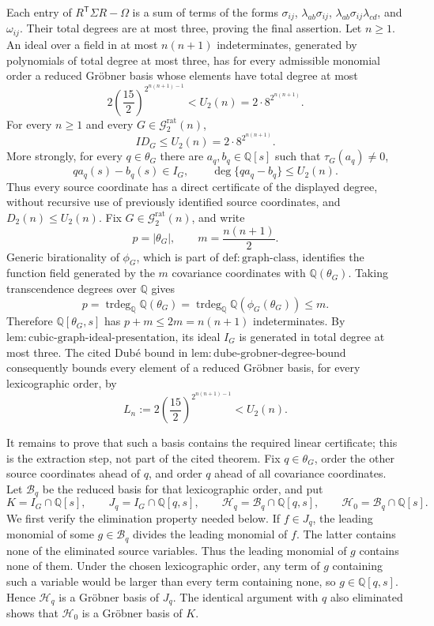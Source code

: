 Each entry of \(R^{\mathsf T}\Sigma R-\Omega\) is a sum of terms of the forms \(\sigma_{ij}\), \(\lambda_{ab}\sigma_{ij}\), \(\lambda_{ab}\sigma_{ij}\lambda_{cd}\), and \(\omega_{ij}\).  Their total degrees are at most three, proving the final assertion.
Let \(n\geq1\).  An ideal over a field in at most \(n(n+1)\) indeterminates, generated by polynomials of total degree at most three, has for every admissible monomial order a reduced Gr\"obner basis whose elements have total degree at most
\[
 2\left(\frac{15}{2}\right)^{2^{n(n+1)-1}}<U_2(n)=2\cdot8^{2^{n(n+1)}}.
\]
For every \(n\geq1\) and every \(G\in\mathcal G_{2}^{\mathrm{rat}}(n)\),
\[
 ID_G\leq U_2(n)=2\cdot8^{2^{n(n+1)}}.
\]
More strongly, for every \(q\in\theta_G\) there are \(a_q,b_q\in\mathbb Q[s]\) such that \(\tau_G(a_q)\neq0\),
\[
 q a_q(s)-b_q(s)\in I_G,
 \qquad
 \deg\{q a_q-b_q\}\leq U_2(n).
\]
Thus every source coordinate has a direct certificate of the displayed degree, without recursive use of previously identified source coordinates, and \(D_2(n)\leq U_2(n)\).
Fix \(G\in\mathcal G_{2}^{\mathrm{rat}}(n)\), and write
\[
 p=|\theta_G|,\qquad m=\frac{n(n+1)}2.
\]
Generic birationality of \(\phi_G\), which is part of \(\mathrm{def:graph\mbox{-}class}\), identifies the function field generated by the \(m\) covariance coordinates with \(\mathbb Q(\theta_G)\).  Taking transcendence degrees over \(\mathbb Q\) gives
\[
 p=\operatorname{trdeg}_{\mathbb Q}\mathbb Q(\theta_G)
   =\operatorname{trdeg}_{\mathbb Q}\mathbb Q(\phi_G(\theta_G))
   \leq m. \tag{1}
\]
Therefore \(\mathbb Q[\theta_G,s]\) has \(p+m\leq2m=n(n+1)\) indeterminates.  By \(\mathrm{lem:cubic\mbox{-}graph\mbox{-}ideal\mbox{-}presentation}\), its ideal \(I_G\) is generated in total degree at most three.  The cited Dub\'e bound in \(\mathrm{lem:dube\mbox{-}grobner\mbox{-}degree\mbox{-}bound}\) consequently bounds every element of a reduced Gr\"obner basis, for every lexicographic order, by
\[
 L_n:=2\left(\frac{15}{2}\right)^{2^{n(n+1)-1}}<U_2(n). \tag{2}
\]

It remains to prove that such a basis contains the required linear certificate; this is the extraction step, not part of the cited theorem.  Fix \(q\in\theta_G\), order the other source coordinates ahead of \(q\), and order \(q\) ahead of all covariance coordinates.  Let \(\mathcal B_q\) be the reduced basis for that lexicographic order, and put
\[
 K=I_G\cap\mathbb Q[s],\qquad
 J_q=I_G\cap\mathbb Q[q,s],\qquad
 \mathcal H_q=\mathcal B_q\cap\mathbb Q[q,s],\qquad
 \mathcal H_0=\mathcal B_q\cap\mathbb Q[s].
\]
We first verify the elimination property needed below.  If \(f\in J_q\), the leading monomial of some \(g\in\mathcal B_q\) divides the leading monomial of \(f\).  The latter contains none of the eliminated source variables.  Thus the leading monomial of \(g\) contains none of them.  Under the chosen lexicographic order, any term of \(g\) containing such a variable would be larger than every term containing none, so \(g\in\mathbb Q[q,s]\).  Hence \(\mathcal H_q\) is a Gr\"obner basis of \(J_q\).  The identical argument with \(q\) also eliminated shows that \(\mathcal H_0\) is a Gr\"obner basis of \(K\).

